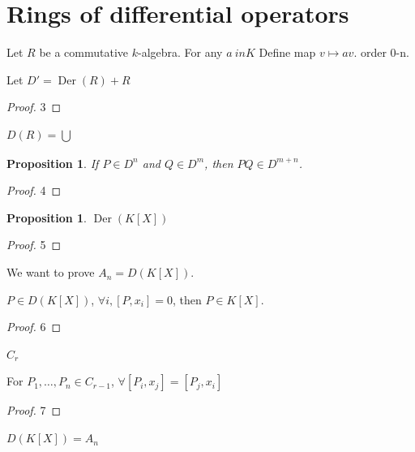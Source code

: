 \documentclass{article}
\newtheorem{proposition}[theorem]{Proposition}
\begin{document}
\section{Rings of differential operators}

Let $ R $ be a commutative $ k $-algebra. For any $ a\ in K $ Define map $ v \mapsto av $. order 0-n.

\begin{lemma}
Let $ D'=\operatorname{Der}(R)+R $ 
\end{lemma}

\begin{proof} 
3
\end{proof}

\begin{definition} 
$ D(R) = \bigcup_{} $ 
\end{definition}

\begin{proposition}
If $ P \in D^n $ and $ Q \in D^m $, then $ PQ \in D^{m+n} $.   
\end{proposition}

\begin{proof} 
4
\end{proof}

\begin{proposition}
$ \operatorname{Der}(K[X]) $ 
\end{proposition}

\begin{proof} 
5
\end{proof}

We want to prove $ A_n=D(K[X]) $.

\begin{lemma}
$ P \in D(K[X]) $, $ \forall i, [P,x_i]=0 $, then $ P \in K[X] $.   
\end{lemma}

\begin{proof} 
6
\end{proof}

\begin{definition} 
$C_r$
\end{definition}

\begin{lemma}
For $ P_1, \ldots, P_n \in C_{r-1} $, $ \forall [P_i,x_j]=[P_j, x_i] $  
\end{lemma}

\begin{proof} 
7
\end{proof}

\begin{theorem} 
$ D(K[X])=A_n $ 
\end{theorem}
\end{document}

